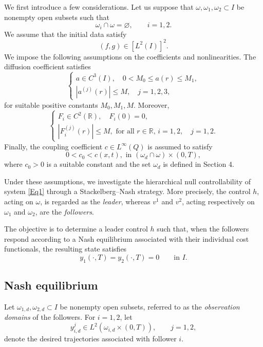 \documentclass[11pt,a4paper]{amsart}
\numberwithin{equation}{section}
\begin{document}
 We first introduce a few considerations. Let us  suppose that $\omega,\omega_1,\omega_2\subset I$ be nonempty open subsets such that
\[
\omega_i\cap\omega=\varnothing,
\qquad i=1,2.
\]
We assume that the initial data satisfy
\[
(f,g)\in [L^2(I)]^2.
\]
We impose the following assumptions on the coefficients and nonlinearities.
The diffusion coefficient satisfies
    \begin{equation} \label{condiciones_a4}
    \begin{cases}
        a\in C^3(I),\quad 0 < M_0 \leq a(r) \leq M_1,\\
        |a^{(j)}(r)|\leq M,\quad j=1,2,3,
    \end{cases}
    \end{equation}
    for suitable positive constants $M_0,M_1,M$. Moreover,
    \begin{equation}
        \begin{cases} \label{condiciones_a4f}
 		 F_i\in C^2(\mathbb{R}), \quad F_i(0)=0,\\
             |{F_{i}^{(j)}(r)}|\leq M, \text{ for all } r \in \mathbb{R}, \, i=1,2,\quad j=1,2.
 	      \end{cases}
    \end{equation}
   Finally, the coupling coefficient $c\in L^\infty(Q)$ is assumed to satisfy
   \begin{equation}\label{condiciones_a4c(x,t)}
    0<c_0<c(x,t), \text{ in } (\omega_d\cap\omega)\times(0,T),
    \end{equation}
    where $c_0>0$ is a suitable constant and  the set $\omega_d$ is defined in Section 4.


 Under these assumptions, we investigate the hierarchical null controllability
of system \eqref{Eq1} through a Stackelberg--Nash strategy. More precisely, the
control $h$, acting on $\omega$, is regarded as the \emph{leader}, whereas
$v^1$ and $v^2$, acting respectively on $\omega_1$ and $\omega_2$, are the
\emph{followers}.

The objective is to determine a leader control $h$ such that, when the
followers respond according to a Nash equilibrium associated with their
individual cost functionals, the resulting state satisfies
\[
y_1(\cdot,T)=y_2(\cdot,T)=0
\qquad
\text{in }I.
\]
      
\subsection{Nash equilibrium}
    Let $\omega_{1,d},\omega_{2,d}\subset I$ be nonempty open subsets, referred
to as the \emph{observation domains} of the followers. For $i=1,2$, let
\[
y_{i,d}^j\in L^2(\omega_{i,d}\times(0,T)),
\qquad
j=1,2,
\]
denote the desired trajectories associated with follower $i$.
\end{document}
